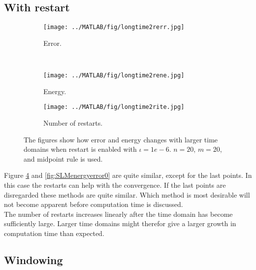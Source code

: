 \subsection{With restart} %
\begin{figure}[H]
        \centering
        \begin{subfigure}[b]{0.45\textwidth}
                \texttt{[image: ../MATLAB/fig/longtime2rerr.jpg]}
                \caption{ Error. }
                \label{fig:longtime2rerr}
        \end{subfigure}
        ~
        \begin{subfigure}[b]{0.45\textwidth}
                \texttt{[image: ../MATLAB/fig/longtime2rene.jpg]}
                \caption{ Energy. }
                \label{fig:longtime8rerr}
        \end{subfigure}
     
        
        \begin{subfigure}[b]{0.45\textwidth}
                \texttt{[image: ../MATLAB/fig/longtime2rite.jpg]}
                \caption{ Number of restarts. }
                \label{fig:longtime2rene}
        \end{subfigure}
        \caption{ The figures show how error and energy changes with larger time domains when restart is enabled with $\iota = 1e-6$. $n = 20$, $m = 20$, and midpoint rule is used. }
        \label{fig:SLMenergyerror1}
\end{figure}
Figure \ref{fig:SLMenergyerror1} and \ref{fig:SLMenergyerror0} are quite similar, except for the last points. In this case the restarts can help with the convergence. If the last points are disregarded these methods are quite similar. Which method is most desirable will not become apparent before computation time is discussed. \\
The number of restarts increases linearly after the time domain has become sufficiently large. Larger time domains might therefor give a larger growth in computation time than expected. \\
\subsection{Windowing} %

